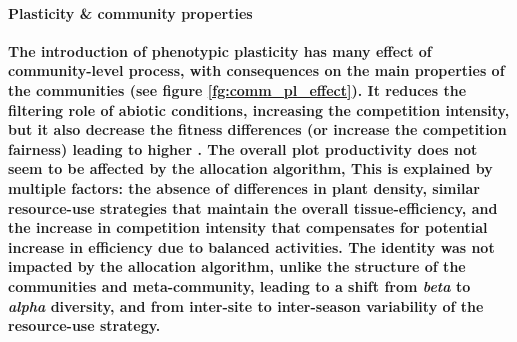 \paragraph{Plasticity \& community properties}

\textbf{The introduction of phenotypic plasticity has many effect of community-level process, with consequences on the main properties of the communities (see figure \ref{fg:comm_pl_effect}). It reduces the filtering role of abiotic conditions, increasing the competition intensity, but it also decrease the fitness differences (or increase the competition fairness) leading to higher . The overall plot productivity does not seem to be affected by the allocation algorithm, This is explained by multiple factors: the absence of differences in plant density, similar resource-use strategies that maintain the overall tissue-efficiency, and the increase in competition intensity that compensates for potential increase in efficiency due to balanced activities. The identity was not impacted by the allocation algorithm, unlike the structure of the communities and meta-community, leading to a shift from \textit{beta} to \textit{alpha} diversity, and from inter-site to inter-season variability of the resource-use strategy.}


\begin{figure}%
    \classiccaptionstyle
{}
\end{figure}


